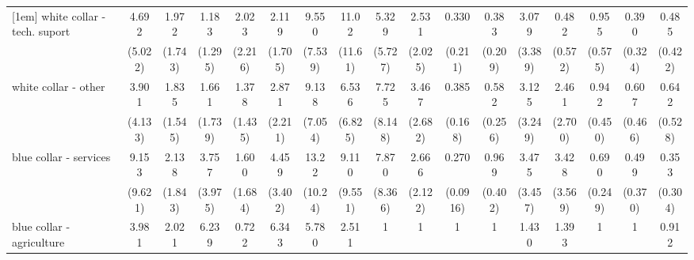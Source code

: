 {\begin{tabular}{l*{16}{c}}
[1em]
white collar - tech. suport&       4.692         &       1.972         &       1.183         &       2.023         &       2.119         &       9.550\sym{**} &       11.02\sym{*}  &       5.329         &       2.531         &       0.330         &       0.383         &       3.079         &       0.482         &       0.955         &       0.390         &       0.485         \\
                    &     (5.022)         &     (1.743)         &     (1.295)         &     (2.216)         &     (1.705)         &     (7.539)         &     (11.61)         &     (5.727)         &     (2.025)         &     (0.211)         &     (0.209)         &     (3.389)         &     (0.572)         &     (0.575)         &     (0.324)         &     (0.422)         \\
[1em]
white collar - other&       3.901         &       1.835         &       1.661         &       1.378         &       2.871         &       9.138\sym{**} &       6.536         &       7.725         &       3.467         &       0.385\sym{*}  &       0.582         &       3.125         &       2.461         &       0.942         &       0.607         &       0.642         \\
                    &     (4.133)         &     (1.545)         &     (1.739)         &     (1.435)         &     (2.211)         &     (7.054)         &     (6.825)         &     (8.148)         &     (2.682)         &     (0.168)         &     (0.256)         &     (3.249)         &     (2.700)         &     (0.450)         &     (0.466)         &     (0.528)         \\
[1em]
blue collar - services&       9.153\sym{*}  &       2.138         &       3.757         &       1.600         &       4.459         &       13.22\sym{***}&       9.110\sym{*}  &       7.870         &       2.666         &       0.270\sym{***}&       0.969         &       3.475         &       3.428         &       0.690         &       0.499         &       0.353         \\
                    &     (9.621)         &     (1.843)         &     (3.975)         &     (1.684)         &     (3.402)         &     (10.24)         &     (9.551)         &     (8.366)         &     (2.122)         &    (0.0916)         &     (0.402)         &     (3.457)         &     (3.569)         &     (0.249)         &     (0.370)         &     (0.304)         \\
[1em]
blue collar - agriculture&       3.981         &       2.021         &       6.239         &       0.722         &       6.343         &       5.780         &       2.511         &           1         &           1         &           1         &           1         &       1.430         &       1.393         &           1         &           1         &       0.912         \\

\end{tabular}}
